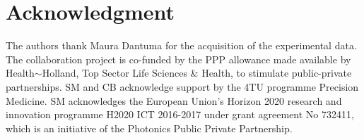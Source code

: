 \documentclass[journal]{IEEEtran}
\begin{document}
\section*{Acknowledgment}
The authors thank Maura Dantuma for the acquisition of the experimental data. The collaboration project is co-funded by the PPP allowance made available by Health$\sim$Holland, Top Sector Life Sciences \& Health, to stimulate public-private partnerships. SM and CB acknowledge support by the 4TU programme Precision Medicine. SM acknowledges the European Union’s Horizon 2020 research and innovation programme H2020 ICT 2016-2017 under grant agreement No 732411, which is an initiative of the Photonics Public Private Partnership.

\ifCLASSOPTIONcaptionsoff
  \newpage
\fi

\small{

}

\newpage

\appendices
\end{document}
